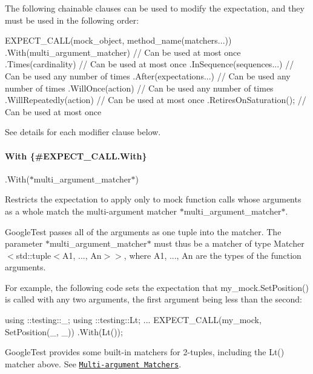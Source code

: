 The following chainable clauses can be used to modify the expectation, and they must be used in the following order\+:


\begin{DoxyCode}
EXPECT\_CALL(mock\_object, method\_name(matchers...))
    .With(multi\_argument\_matcher)  \textcolor{comment}{// Can be used at most once}
    .Times(cardinality)            \textcolor{comment}{// Can be used at most once}
    .InSequence(sequences...)      \textcolor{comment}{// Can be used any number of times}
    .After(expectations...)        \textcolor{comment}{// Can be used any number of times}
    .WillOnce(action)              \textcolor{comment}{// Can be used any number of times}
    .WillRepeatedly(action)        \textcolor{comment}{// Can be used at most once}
    .RetiresOnSaturation();        \textcolor{comment}{// Can be used at most once}
\end{DoxyCode}


See details for each modifier clause below.

\paragraph*{With \{\#\+E\+X\+P\+E\+C\+T\+\_\+\+C\+A\+L\+L.\+With\}}

{\ttfamily .With(}$\ast${\ttfamily multi\+\_\+argument\+\_\+matcher}$\ast${\ttfamily )}

Restricts the expectation to apply only to mock function calls whose arguments as a whole match the multi-\/argument matcher $\ast${\ttfamily multi\+\_\+argument\+\_\+matcher}$\ast$.

Google\+Test passes all of the arguments as one tuple into the matcher. The parameter $\ast${\ttfamily multi\+\_\+argument\+\_\+matcher}$\ast$ must thus be a matcher of type {\ttfamily Matcher$<$std\+::tuple$<$A1, ..., An$>$$>$}, where {\ttfamily A1, ..., An} are the types of the function arguments.

For example, the following code sets the expectation that {\ttfamily my\+\_\+mock.\+Set\+Position()} is called with any two arguments, the first argument being less than the second\+:


\begin{DoxyCode}
using ::testing::\_;
using ::testing::Lt;
...
EXPECT\_CALL(my\_mock, SetPosition(\_, \_))
    .With(Lt());
\end{DoxyCode}


Google\+Test provides some built-\/in matchers for 2-\/tuples, including the {\ttfamily Lt()} matcher above. See \href{matchers.md#MultiArgMatchers}{\tt Multi-\/argument Matchers}.

